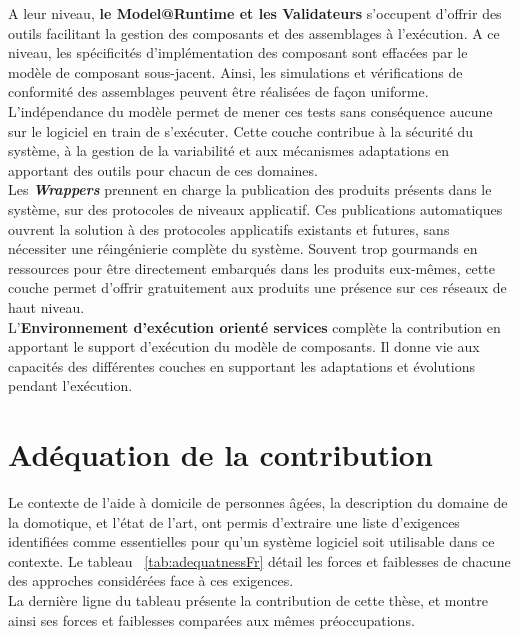 A leur niveau, {\bf le Model@Runtime et les Validateurs} s'occupent d'offrir des outils facilitant la gestion des composants et des assemblages à l'exécution. A ce niveau, les spécificités d'implémentation des composant sont effacées par le modèle de composant sous-jacent. Ainsi, les simulations et vérifications de conformité des assemblages peuvent être réalisées de façon uniforme.
L'indépendance du modèle permet de mener ces tests sans conséquence aucune sur le logiciel en train de s'exécuter. Cette couche contribue à la sécurité du système, à la gestion de la variabilité et aux mécanismes adaptations en apportant des outils pour chacun de ces domaines.\\

Les {\it\bf Wrappers} prennent en charge la publication des produits présents dans le système, sur des protocoles de niveaux applicatif. Ces publications automatiques ouvrent la solution à des protocoles applicatifs existants et futures, sans nécessiter une réingénierie complète du système. Souvent trop gourmands en ressources pour être directement embarqués dans les produits eux-mêmes, cette couche permet d'offrir gratuitement aux produits une présence sur ces réseaux de haut niveau.\\

L'{\bf Environnement d'exécution orienté services} complète la contribution en apportant le support d'exécution du modèle de composants. Il donne vie aux capacités des différentes couches en supportant les adaptations et évolutions pendant l'exécution.\\


\section{Adéquation de la contribution}
\label{sec:adequationFr}
Le contexte de l'aide à domicile de personnes âgées, la description du domaine de la domotique, et l'état de l'art, ont permis d'extraire une liste d'exigences identifiées comme essentielles pour qu'un système logiciel soit utilisable dans ce contexte. Le tableau ~\ref{tab:adequatnessFr} détail les forces et faiblesses de chacune des approches considérées face à ces exigences.\\
La dernière ligne du tableau présente la contribution de cette thèse, et montre ainsi ses forces et faiblesses comparées aux mêmes préoccupations.\\

